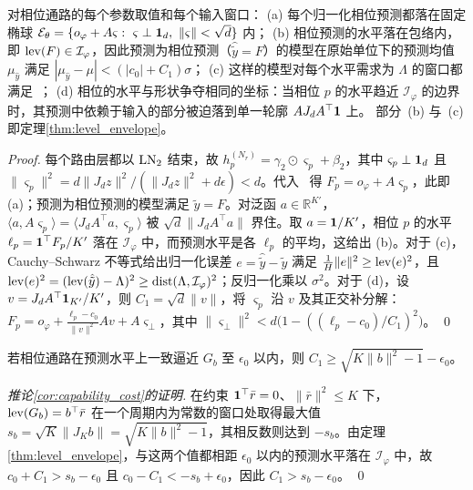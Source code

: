 { 对相位通路的每个参数取值和每个输入窗口：
(a) 每个归一化相位预测都落在固定椭球 $\mathcal E_\theta=\{o_\varphi+A\varsigma:\ \varsigma\perp\one_d,\ \|\varsigma\|<\sqrt d\}$ 内；
(b) 相位预测的水平落在包络内，即 $\operatorname{lev}(F)\in\mathcal I_\varphi$，因此预测为相位预测（$\hat{\tilde y}=F$）的模型在原始单位下的预测均值 $\mu_{\hat y}$ 满足 $|\mu_{\hat y}-\mu|<(|c_0|+C_1)\sigma$；
(c) 这样的模型对每个水平需求为 $\Lambda$ 的窗口都满足~；
(d) 相位的水平与形状争夺相同的坐标：当相位 $p$ 的水平趋近 $\mathcal I_\varphi$ 的边界时，其预测中依赖于输入的部分被迫落到单一轮廓 $AJ_dA^\top\mathbf 1$ 上。
部分~(b) 与~(c) 即定理\ref{thm:level_envelope}。

\begin{proof}
每个路由层都以 $\operatorname{LN}_2$ 结束，故 $h^{(N_r)}_p=\gamma_2\odot\varsigma_p+\beta_2$，其中 $\varsigma_p\perp\mathbf 1_d$ 且 $\|\varsigma_p\|^2=d\|J_dz\|^2/(\|J_dz\|^2+d\epsilon)<d$。代入~ 得 $F_p=o_\varphi+A\varsigma_p$，此即 (a)；预测为相位预测的模型满足 $\hat{\tilde y}=F$。对泛函 $a\in\mathbb R^{K'}$，$\langle a,A\varsigma_p\rangle=\langle J_dA^\top a,\varsigma_p\rangle$ 被 $\sqrt d\|J_dA^\top a\|$ 界住。取 $a=\mathbf 1/K'$，相位 $p$ 的水平 $\ell_p=\mathbf 1^\top F_p/K'$ 落在 $\mathcal I_\varphi$ 中，而预测水平是各 $\ell_p$ 的平均，这给出 (b)。对于 (c)，Cauchy--Schwarz 不等式给出归一化误差 $e=\hat{\tilde y}-\tilde y$ 满足 $\tfrac1H\|e\|^2\ge\operatorname{lev}(e)^2$，且 $\operatorname{lev}(e)^2=(\operatorname{lev}(\hat{\tilde y})-\Lambda)^2\ge\operatorname{dist}(\Lambda,\mathcal I_\varphi)^2$；反归一化乘以 $\sigma^2$。对于 (d)，设 $v=J_dA^\top\mathbf 1_{K'}/K'$，则 $C_1=\sqrt d\|v\|$，将 $\varsigma_p$ 沿 $v$ 及其正交补分解：$F_p=o_\varphi+\tfrac{\ell_p-c_0}{\|v\|^2}Av+A\varsigma_\perp$，其中 $\|\varsigma_\perp\|^2<d\big(1-((\ell_p-c_0)/C_1)^2\big)$。 \qed
\end{proof}

\begin{corollary}[能力以包络宽度为代价]
\label{cor:capability_cost}
若相位通路在预测水平上一致逼近 $G_b$ 至 $\epsilon_0$ 以内，则 $C_1\ge\sqrt{K\|b\|^2-1}-\epsilon_0$。
\end{corollary}

\begin{proof}[推论\ref{cor:capability_cost}的证明]
在约束 $\mathbf 1^\top\bar r=0$、$\|\bar r\|^2\le K$ 下，$\operatorname{lev}(G_b)=b^\top\bar r$ 在一个周期内为常数的窗口处取得最大值 $s_b=\sqrt K\|J_Kb\|=\sqrt{K\|b\|^2-1}$，其相反数则达到 $-s_b$。由定理\ref{thm:level_envelope}，与这两个值都相距 $\epsilon_0$ 以内的预测水平落在 $\mathcal I_\varphi$ 中，故 $c_0+C_1>s_b-\epsilon_0$ 且 $c_0-C_1<-s_b+\epsilon_0$，因此 $C_1>s_b-\epsilon_0$。 \qed
\end{proof}

}
